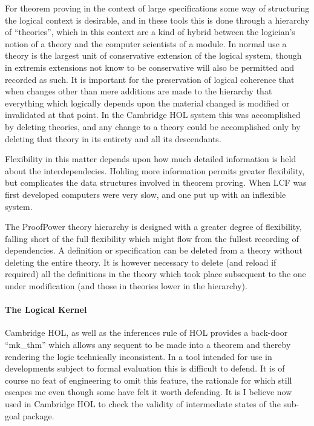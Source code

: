 \documentclass[10pt,titlepage]{book}
\def\Product{ProofPower}
\begin{document}
For theorem proving in the context of large specifications some way of structuring the logical context is desirable, and in these tools this is done through a hierarchy of ``theories'', which in this context are a kind of hybrid between the logician's notion of a theory and the computer scientists of a module.
In normal use a theory is the largest unit of conservative extension of the logical system, though in extremis extensions not know to be conservative will also be permitted and recorded as such.
It is important for the preservation of logical coherence that when changes other than mere additions are made to the hierarchy that everything which logically depends upon the material changed is modified or invalidated at that point.
In the Cambridge HOL system this was accomplished by deleting theories, and any change to a theory could be accomplished only by deleting that theory in its entirety and all its descendants.

Flexibility in this matter depends upon how much detailed information is held about the interdependecies.
Holding more information permits greater flexibility, but complicates the data structures involved in theorem proving.
When LCF was first developed computers were very slow, and one put up with an inflexible system.

The {\Product} theory hierarchy is designed with a greater degree of flexibility, falling short of the full flexibility which might flow from the fullest recording of dependencies.
A definition or specification can be deleted from a theory without deleting the entire theory.
It is however necessary to delete (and reload if required) all the definitions in the theory which took place subsequent to the one under modification (and those in theories lower in the hierarchy).

\paragraph{The Logical Kernel}

Cambridge HOL, as well as the inferences rule of HOL provides a back-door ``mk\_thm'' which allows any sequent to be made into a theorem and thereby rendering the logic technically inconsistent.
In a tool intended for use in developments subject to formal evaluation this is difficult to defend.
It is of course no feat of engineering to omit this feature, the rationale for which still escapes me even though some have felt it worth defending.
It is I believe now used in Cambridge HOL to check the validity of intermediate states of the sub-goal package.
\end{document}

